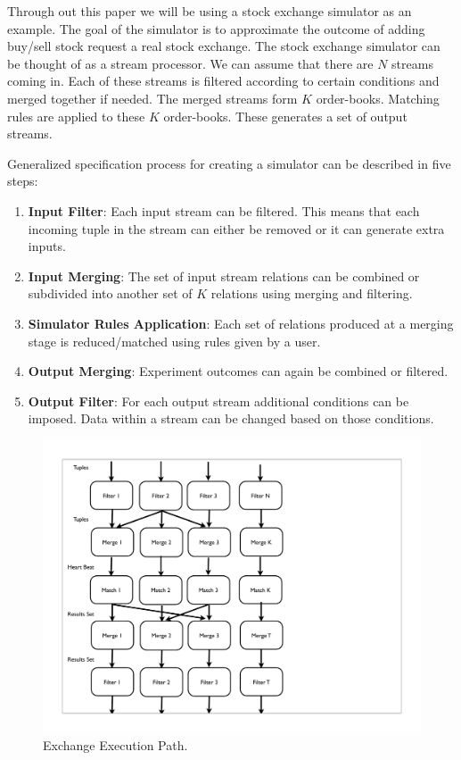 \documentclass{article}
\begin{document}
Through out this paper we will be using a stock exchange simulator as an example. The goal of the simulator is to approximate the outcome of adding buy/sell stock request a real stock exchange. The stock exchange simulator can be thought of as a stream processor. We can assume that there are $N$ streams coming in. Each of these streams is filtered according to certain conditions and merged together if needed. The merged streams form $K$ order-books. Matching rules are applied to these $K$ order-books. These generates a set of output streams.

Generalized specification process for creating a simulator can be described in five steps:

\begin{enumerate}
    \item {\bf Input Filter}: Each input stream can be filtered. This means that each incoming tuple in the stream can either be removed or it can generate extra inputs. 
    \item {\bf Input Merging}: The set of input stream relations can be combined or subdivided into another set of $K$ relations using merging and filtering. 
    \item {\bf Simulator Rules Application}: Each set of relations produced at a merging stage is reduced/matched using rules given by a user.
    \item {\bf Output Merging}: Experiment outcomes can again be combined or filtered.
    \item {\bf Output Filter}: For each output stream additional conditions can be imposed. Data within a stream can be changed based on those conditions.
\end{enumerate}

\begin{figure}
  \includegraphics[width=4.50in]{figures/ExchangeFigure.pdf}
  \caption{Exchange Execution Path.}
  \label{fig:overview}
\end{figure}
\end{document}
